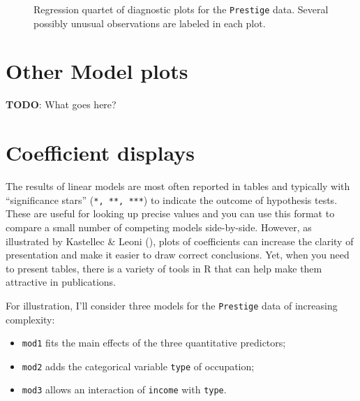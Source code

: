 \documentclass[
  letterpaper,
  10pt,
  krantz2]{krantz}
\providecommand{\tightlist}{%
  \setlength{\itemsep}{0pt}\setlength{\parskip}{0pt}}\usepackage{longtable,booktabs,array}
\begin{document}
{\begin{figure}[H]
{}

\caption{\label{fig-plot-prestige-mod}Regression quartet of diagnostic
plots for the \texttt{Prestige} data. Several possibly unusual
observations are labeled in each plot.}

\end{figure}%

\section{Other Model plots}\label{other-model-plots}

\textbf{TODO}: What goes here?

\section{Coefficient displays}\label{coefficient-displays}

The results of linear models are most often reported in tables and
typically with ``significance stars'' (\texttt{*,\ **,\ ***}) to
indicate the outcome of hypothesis tests. These are useful for looking
up precise values and you can use this format to compare a small number
of competing models side-by-side. However, as illustrated by Kastellec
\& Leoni (), plots of
coefficients can increase the clarity of presentation and make it easier
to draw correct conclusions. Yet, when you need to present tables, there
is a variety of tools in R that can help make them attractive in
publications.

For illustration, I'll consider three models for the \texttt{Prestige}
data of increasing complexity:

\begin{itemize}
\tightlist
\item
  \texttt{mod1} fits the main effects of the three quantitative
  predictors;
\item
  \texttt{mod2} adds the categorical variable \texttt{type} of
  occupation;
\item
  \texttt{mod3} allows an interaction of \texttt{income} with
  \texttt{type}.
\end{itemize}

}
\end{document}
